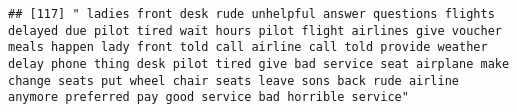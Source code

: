 \documentclass[
]{article}
\begin{document}
\begin{verbatim}
## [117] " ladies front desk rude unhelpful answer questions flights delayed due pilot tired wait hours pilot flight airlines give voucher meals happen lady front told call airline call told provide weather delay phone thing desk pilot tired give bad service seat airplane make change seats put wheel chair seats leave sons back rude airline anymore preferred pay good service bad horrible service"                                                                                                                                                                                                                                                                                                                                                                                                                                                                                                                                                                                                                                                                                                                                                                                                                                                                                                                                                                                                                                                                                                                                                                                                                                                                                                                                                                                           

\end{verbatim}
\end{document}
